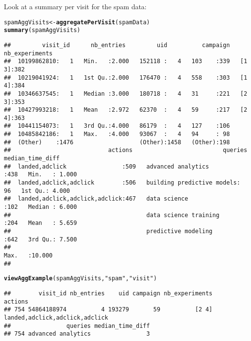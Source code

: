 \documentclass{article}\usepackage[]{graphicx}\usepackage[]{color}
\makeatletter
\newcommand{\hlstr}[1]{\textcolor[rgb]{0.192,0.494,0.8}{#1}}%
\newcommand{\hlstd}[1]{\textcolor[rgb]{0.345,0.345,0.345}{#1}}%
\newcommand{\hlkwb}[1]{\textcolor[rgb]{0.69,0.353,0.396}{#1}}%
\newcommand{\hlkwd}[1]{\textcolor[rgb]{0.737,0.353,0.396}{\textbf{#1}}}%
\newenvironment{kframe}{%
 \def\at@end@of@kframe{}%
 \ifinner\ifhmode%
  \def\at@end@of@kframe{\end{minipage}}%
  \begin{minipage}{\columnwidth}%
 \fi\fi%
 \def\FrameCommand##1{\hskip\@totalleftmargin \hskip-\fboxsep
 \colorbox{shadecolor}{##1}\hskip-\fboxsep
     \hskip-\linewidth \hskip-\@totalleftmargin \hskip\columnwidth}%
 \MakeFramed {\advance\hsize-\width
   \@totalleftmargin\z@ \linewidth\hsize
   \@setminipage}}%
 {\par\unskip\endMakeFramed%
 \at@end@of@kframe}
\newenvironment{knitrout}{}{} %
\makeatother
\begin{document}
Look at a summary per visit for the spam data:
\begin{knitrout}
\color{fgcolor}\begin{kframe}
\begin{alltt}
\hlstd{spamAggVisits} \hlkwb{<-} \hlkwd{aggregatePerVisit}\hlstd{(spamData)}
\hlkwd{summary}\hlstd{(spamAggVisits)}
\end{alltt}
\begin{verbatim}
##         visit_id      nb_entries         uid          campaign   nb_experiments
##  10199862810:   1   Min.   :2.000   152118 :   4   103    :339   [1 3]:382     
##  10219041924:   1   1st Qu.:2.000   176470 :   4   558    :303   [1 4]:384     
##  10346637545:   1   Median :3.000   180718 :   4   31     :221   [2 3]:353     
##  10427993218:   1   Mean   :2.972   62370  :   4   59     :217   [2 4]:363     
##  10441154073:   1   3rd Qu.:4.000   86179  :   4   127    :106                 
##  10485842186:   1   Max.   :4.000   93067  :   4   94     : 98                 
##  (Other)    :1476                   (Other):1458   (Other):198                 
##                            actions                          queries    median_time_diff
##  landed,adclick                :509   advanced analytics        :438   Min.   : 1.000  
##  landed,adclick,adclick        :506   building predictive models: 96   1st Qu.: 4.000  
##  landed,adclick,adclick,adclick:467   data science              :102   Median : 6.000  
##                                       data science training     :204   Mean   : 5.659  
##                                       predictive modeling       :642   3rd Qu.: 7.500  
##                                                                        Max.   :10.000  
## 
\end{verbatim}
\begin{alltt}
\hlkwd{viewAggExample}\hlstd{(spamAggVisits,} \hlstr{"spam"}\hlstd{,} \hlstr{"visit"}\hlstd{)}
\end{alltt}
\begin{verbatim}
##        visit_id nb_entries    uid campaign nb_experiments                        actions
## 754 54864188974          4 193279       59          [2 4] landed,adclick,adclick,adclick
##                queries median_time_diff
## 754 advanced analytics                3
\end{verbatim}
\end{kframe}
\end{knitrout}
\end{document}
